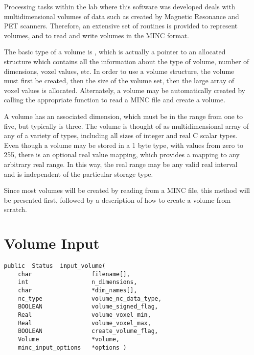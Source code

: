 Processing tasks within the lab where this software was developed
deals with multidimensional volumes of data such as created by
Magnetic Resonance and PET scanners.  Therefore, an extensive set of
routines is provided to represent volumes, and to read and write
volumes in the MINC format.

The basic type of a volume is , which is actually a
pointer to an allocated structure which contains all the information
about the type of volume, number of dimensions, voxel values, etc.  In
order to use a volume structure, the volume must first be created, then
the size of the volume set, then the large array of voxel values is
allocated.  Alternately, a volume may be automatically created by
calling the appropriate function to read a MINC file and create a
volume.

A volume has an associated dimension, which must be in the range
from one to five, but typically is three.  The volume is thought of as
multidimensional array of any of a variety of types, including all
sizes of integer and real C scalar types.  Even though a volume may be
stored in a 1 byte type, with values from zero to 255, there is an
optional real value mapping, which provides a mapping to any arbitrary
real range.  In this way, the real range may be any valid real
interval and is independent of the particular storage type.

Since most volumes will be created by reading from a MINC file, this
method will be presented first, followed by a description of how to
create a volume from scratch.

\section{Volume Input}

{\bf\begin{verbatim}
public  Status  input_volume(
    char                 filename[],
    int                  n_dimensions,
    char                 *dim_names[],
    nc_type              volume_nc_data_type,
    BOOLEAN              volume_signed_flag,
    Real                 volume_voxel_min,
    Real                 volume_voxel_max,
    BOOLEAN              create_volume_flag,
    Volume               *volume,
    minc_input_options   *options )
\end{verbatim}}


